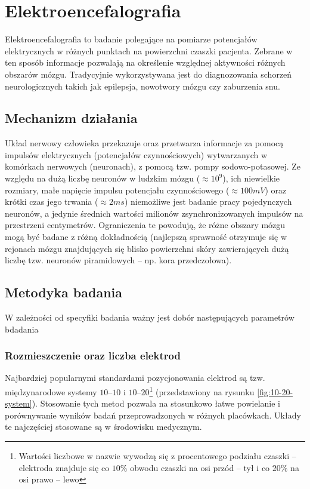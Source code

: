 \documentclass{./assets/wfis}
\begin{document}
\section{Elektroencefalografia}
Elektroencefalografia to badanie polegające na pomiarze potencjałów elektrycznych w różnych punktach na powierzchni czaszki pacjenta. Zebrane w ten sposób informacje pozwalają na określenie względnej aktywności różnych obszarów mózgu. Tradycyjnie wykorzystywana jest do diagnozowania schorzeń neurologicznych takich jak epilepsja, nowotwory mózgu czy zaburzenia snu.

\subsection{Mechanizm działania}
Układ nerwowy człowieka przekazuje oraz przetwarza informacje za pomocą impulsów elektrycznych (potencjałów czynnościowych) wytwarzanych w komórkach nerwowych (neuronach), z pomocą tzw. pompy sodowo-potasowej. Ze względu na dużą liczbę neuronów w ludzkim mózgu ($\approx10^9$\cite{herculano-houzel_human_2009}), ich niewielkie rozmiary, małe napięcie impulsu potencjału czynnościowego ($\approx100mV$\cite{biga_anatomy_2019}) oraz krótki czas jego trwania ($\approx2ms$\cite{biga_anatomy_2019}) niemożliwe jest badanie pracy pojedynczych neuronów, a jedynie średnich wartości milionów zsynchronizowanych impulsów na przestrzeni centymetrów. Ograniczenia te powodują, że różne obszary mózgu mogą być badane z różną dokładnością (najlepszą sprawność otrzymuje się w rejonach mózgu znajdujących się blisko powierzchni skóry zawierających dużą liczbę tzw. neuronów piramidowych – np. kora przedczołowa).

\subsection{Metodyka badania}
W zależności od specyfiki badania ważny jest dobór następujących parametrów bdadania 

\subsubsection{Rozmieszczenie oraz liczba elektrod}
Najbardziej popularnymi standardami pozycjonowania elektrod są tzw. międzynarodowe systemy $10$–$10$ i $10$–$20$\footnote{Wartości liczbowe w nazwie wywodzą się  z procentowego podziału czaszki – elektroda znajduje się co $10\%$ obwodu czaszki na osi przód – tył i co $20\%$ na osi prawo – lewo} \cite{herbert_h_jasper_report_1958} (przedstawiony na rysunku \ref{fig:10-20-system}). Stosowanie tych metod pozwala na stosunkowo łatwe powielanie i porównywanie wyników badań przeprowadzonych w różnych placówkach. Układy te najczęściej stosowane są w środowisku medycznym. 
\end{document}
